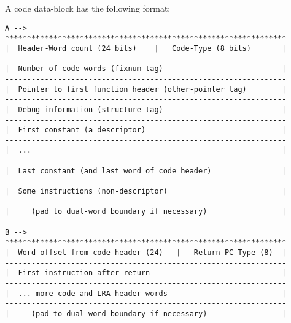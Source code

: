 A code data-block has the following format:
\begin{verbatim}
A -->
****************************************************************
|  Header-Word count (24 bits)    |   Code-Type (8 bits)       |
----------------------------------------------------------------
|  Number of code words (fixnum tag)                           |
----------------------------------------------------------------
|  Pointer to first function header (other-pointer tag)        |
----------------------------------------------------------------
|  Debug information (structure tag)                           |
----------------------------------------------------------------
|  First constant (a descriptor)                               |
----------------------------------------------------------------
|  ...                                                         |
----------------------------------------------------------------
|  Last constant (and last word of code header)                |
----------------------------------------------------------------
|  Some instructions (non-descriptor)                          |
----------------------------------------------------------------
|     (pad to dual-word boundary if necessary)                 |

B -->
****************************************************************
|  Word offset from code header (24)   |   Return-PC-Type (8)  |
----------------------------------------------------------------
|  First instruction after return                              |
----------------------------------------------------------------
|  ... more code and LRA header-words                          |
----------------------------------------------------------------
|     (pad to dual-word boundary if necessary)                 |


\end{verbatim}
